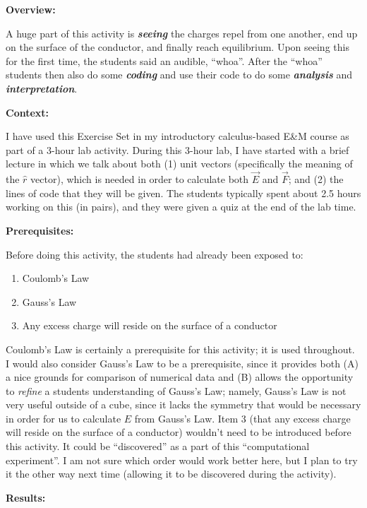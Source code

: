 \documentclass[]{article}
\providecommand{\tightlist}{%
  \setlength{\itemsep}{0pt}\setlength{\parskip}{0pt}}
\begin{document}
\textbf{Overview:}

A huge part of this activity is \textbf{\emph{seeing}} the charges repel
from one another, end up on the surface of the conductor, and finally
reach equilibrium. Upon seeing this for the first time, the students
said an audible, ``whoa''. After the ``whoa'' students then also do some
\textbf{\emph{coding}} and use their code to do some
\textbf{\emph{analysis}} and \textbf{\emph{interpretation}}.

\textbf{Context:}

I have used this Exercise Set in my introductory calculus-based E\&M
course as part of a 3-hour lab activity. During this 3-hour lab, I have
started with a brief lecture in which we talk about both (1) unit
vectors (specifically the meaning of the \(\hat{r}\) vector), which is
needed in order to calculate both \(\vec{E}\) and \(\vec{F}\); and (2)
the lines of code that they will be given. The students typically spent
about 2.5 hours working on this (in pairs), and they were given a quiz
at the end of the lab time.

\textbf{Prerequisites:}

Before doing this activity, the students had already been exposed to:

\begin{enumerate}
\def\labelenumi{\arabic{enumi}.}
\tightlist
\item
  Coulomb's Law
\item
  Gauss's Law
\item
  Any excess charge will reside on the surface of a conductor
\end{enumerate}

Coulomb's Law is certainly a prerequisite for this activity; it is used
throughout. I would also consider Gauss's Law to be a prerequisite,
since it provides both (A) a nice grounds for comparison of numerical
data and (B) allows the opportunity to \emph{refine} a students
understanding of Gauss's Law; namely, Gauss's Law is not very useful
outside of a cube, since it lacks the symmetry that would be necessary
in order for us to calculate \(E\) from Gauss's Law. Item 3 (that any
excess charge will reside on the surface of a conductor) wouldn't need
to be introduced before this activity. It could be ``discovered'' as a
part of this ``computational experiment''. I am not sure which order
would work better here, but I plan to try it the other way next time
(allowing it to be discovered during the activity).

\textbf{Results:}
\end{document}
